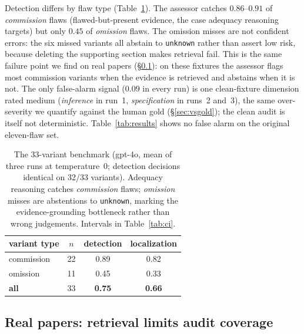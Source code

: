 Detection differs by flaw type (Table~\ref{tab:variants}). The
assessor catches $0.86$--$0.91$ of \emph{commission} flaws (flawed-but-present
evidence, the case adequacy reasoning targets) but only $0.45$ of \emph{omission}
flaws. The omission misses are not confident errors: the six missed variants all
abstain to \texttt{unknown} rather than assert low risk, because deleting the
supporting section makes retrieval fail. This is the same failure point we find on real papers
(\S\ref{sec:realpapers}): on these fixtures the assessor flags most
commission variants when the evidence is retrieved and abstains when it is
not. The only false-alarm signal ($0.09$ in every run) is one
clean-fixture dimension rated medium (\emph{inference} in run~1,
\emph{specification} in runs~2 and~3), the same over-severity we quantify
against the human gold (\S\ref{sec:vsgold}); the clean audit is itself not
deterministic. Table~\ref{tab:results} shows no false alarm on the original
eleven-flaw set.

\begin{table}[t]
  \centering\small
  \caption{The 33-variant benchmark (gpt-4o, mean of three runs at
  temperature~0; detection decisions identical on 32/33 variants). Adequacy reasoning
  catches \emph{commission} flaws; \emph{omission} misses are abstentions to
  \texttt{unknown}, marking the evidence-grounding bottleneck rather than wrong
  judgements. Intervals in Table~\ref{tab:ci}.}
  \label{tab:variants}
  \begin{tabular}{lccc}
    \toprule
    \rowcolor{tablehead} variant type & $n$ & detection & localization \\
    \midrule
    commission & 22 & 0.89 & 0.82 \\
    omission   & 11 & 0.45 & 0.33 \\
    \midrule
    \textbf{all} & 33 & \textbf{0.75} & \textbf{0.66} \\
    \bottomrule
  \end{tabular}
\end{table}

\subsection{Real papers: retrieval limits audit coverage}
\label{sec:realpapers}

